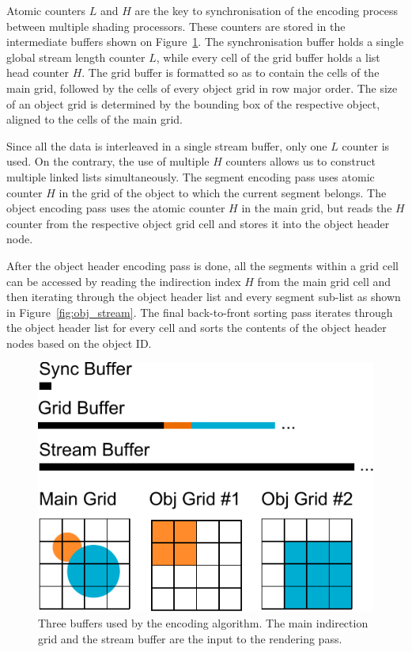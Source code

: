 \documentclass[11pt,a4paper,twoside]{article}
\begin{document}
Atomic counters $L$ and $H$ are the key to synchronisation of the encoding process between multiple shading processors. These counters are stored in the intermediate buffers shown on Figure~\ref{fig:data_buffers}. The synchronisation buffer holds a single global stream length counter $L$, while every cell of the grid buffer holds a list head counter $H$. The grid buffer is formatted so as to contain the cells of the main grid, followed by the cells of every object grid in row major order. The size of an object grid is determined by the bounding box of the respective object, aligned to the cells of the main grid.

Since all the data is interleaved in a single stream buffer, only one $L$ counter is used. On the contrary, the use of multiple $H$ counters allows us to construct multiple linked lists simultaneously. The segment encoding pass uses atomic counter $H$ in the grid of the object to which the current segment belongs. The object encoding pass uses the atomic counter $H$ in the main grid, but reads the $H$ counter from the respective object grid cell and stores it into the object header node.

After the object header encoding pass is done, all the segments within a grid cell can be accessed by reading the indirection index $H$ from the main grid cell and then iterating through the object header list and every segment sub-list as shown in Figure~\ref{fig:obj_stream}. The final back-to-front sorting pass iterates through the object header list for every cell and sorts the contents of the object header nodes based on the object ID.

\begin {figure}
	\centering
	\includegraphics[width=0.5\columnwidth] {figures/data_buffers}
	\caption {Three buffers used by the encoding algorithm. The main indirection grid and the stream buffer are the input to the rendering pass.}
	\label {fig:data_buffers}
\end {figure}

\end{document}
